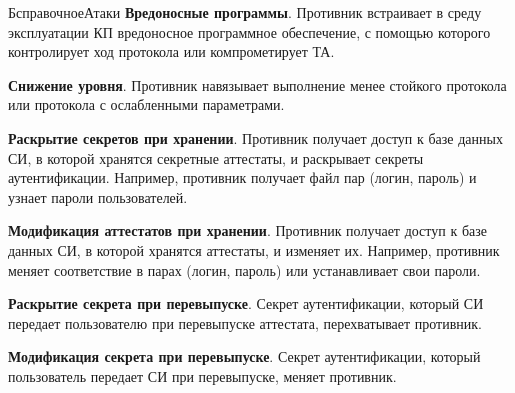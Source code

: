 \begin{appendix}{Б}{справочное}{Атаки}
{\bf Вредоносные программы}. 
Противник встраивает в среду эксплуатации КП вредоносное 
программное обеспечение, с помощью которого контролирует
ход протокола или компрометирует ТА.


{\bf Снижение уровня}. 
Противник навязывает выполнение менее стойкого протокола
или протокола с ослабленными параметрами.


\label{ATK.CM}

{\bf Раскрытие секретов при хранении}.
Противник получает доступ к базе данных СИ, в которой хранятся 
секретные аттестаты, и раскрывает секреты аутентификации. 
%
Например, противник получает файл пар (логин, пароль) и узнает пароли 
пользователей. 


{\bf Модификация аттестатов при хранении}.
Противник получает доступ к базе данных СИ, в которой хранятся аттестаты,
и изменяет их. 
%
Например, противник меняет соответствие в парах (логин, пароль)
или устанавливает свои пароли.


{\bf Раскрытие секрета при перевыпуске}. 
Секрет аутентификации, который СИ передает пользователю при перевыпуске
аттестата, перехватывает противник.


{\bf Модификация секрета при перевыпуске}. 
Секрет аутентификации, который пользователь передает СИ при перевыпуске, 
меняет противник.  


\end{appendix}
